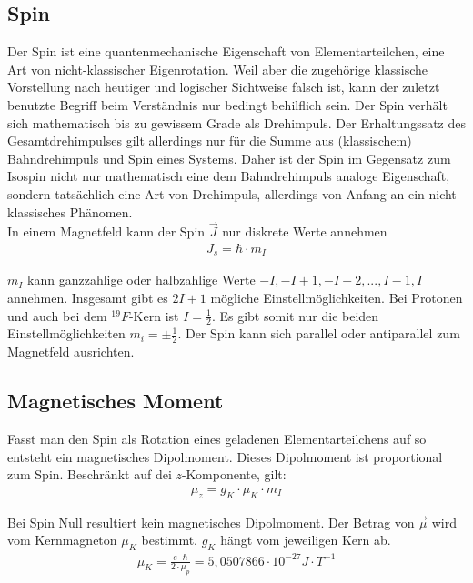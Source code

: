 \documentclass[12pt]{article}
\begin{document}
\subsection{Spin}
Der Spin ist eine quantenmechanische Eigenschaft von Elementarteilchen, eine Art von nicht-klassischer Eigenrotation. Weil aber die zugehörige klassische Vorstellung nach heutiger und logischer Sichtweise falsch ist, kann der zuletzt benutzte Begriff beim Verständnis nur bedingt behilflich sein. Der Spin verhält sich mathematisch bis zu gewissem Grade als Drehimpuls. Der Erhaltungssatz des Gesamtdrehimpulses gilt allerdings nur für die Summe aus (klassischem) Bahndrehimpuls und Spin eines Systems. Daher ist der Spin im Gegensatz zum Isospin nicht nur mathematisch eine dem Bahndrehimpuls analoge Eigenschaft, sondern tatsächlich eine Art von Drehimpuls, allerdings von Anfang an ein nicht-klassisches Phänomen.\\

In einem Magnetfeld kann der Spin $\vec{J}$ nur diskrete Werte annehmen
\begin{align}
 J_s = \hbar \cdot m_{I}
\end{align}

$m_I$ kann ganzzahlige oder halbzahlige Werte $-I, -I+1, -I+2, ..., I-1, I$ annehmen. Insgesamt gibt es $2I+1$ mögliche Einstellmöglichkeiten. Bei Protonen und auch bei dem $^19 F$-Kern ist $I = \frac{1}{2}$. Es gibt somit nur die beiden Einstellmöglichkeiten $m_i = \pm \frac{1}{2}$. Der Spin kann sich parallel oder antiparallel zum Magnetfeld ausrichten.

\subsection{Magnetisches Moment}
Fasst man den Spin als Rotation eines geladenen Elementarteilchens auf so entsteht ein magnetisches Dipolmoment. Dieses Dipolmoment ist proportional zum Spin. Beschränkt auf dei $z$-Komponente, gilt:
\begin{align}
\label{spinmoment}
 \mu_z = g_K \cdot \mu_K \cdot m_I
\end{align}

Bei Spin Null resultiert kein magnetisches Dipolmoment. Der Betrag von $\vec\mu$ wird vom Kernmagneton $\mu_K$ bestimmt. $g_K$ hängt vom jeweiligen Kern ab.
\begin{align}
 \mu_K = \frac{e \cdot \hbar}{2 \cdot \mu_p} = 5,0507866 \cdot 10^{-27} J \cdot T^{-1}
\end{align}
\end{document}
